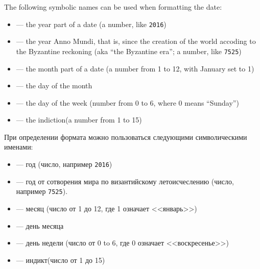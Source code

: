 \begin{EN}
The following symbolic names can be used when formatting the date:
\begin{itemize}
\item {} --- the year part of a date (a number, like \texttt{2016})
\item {}\footnotemark[1] --- the year Anno Mundi, that is, since the creation of the world accoding to the Byzantine reckoning (aka ``the Byzantine era''; a number, like \texttt{7525})
\item {} --- the month part of a date (a number from 1 to 12, with January set to 1)
\item {} --- the day of the month
\item {}\footnotemark[1] --- the day of the week (number from 0 to 6, where 0 means ``Sunday'')
\item {} --- the indiction\footnotemark[2] (a number from 1 to 15)
\end{itemize}

\end{EN}

\begin{RU}
При определении формата можно пользоваться следующими символическими именами:
\begin{itemize}
\item {} --- год (число, например \texttt{2016})
\item {}\footnotemark[1] --- год от сотворения мира по византийскому летоисчеслению (число, например \texttt{7525}).
\item {} --- месяц (число от 1 до 12, где 1 означает <<январь>>)
\item {} --- день месяца
\item {}\footnotemark[1] --- день недели (число от 0 to 6, где 0 означает <<воскресенье>>)
\item {} --- индикт\footnotemark[2] (число от 1 до 15)
\end{itemize}
\end{RU}

